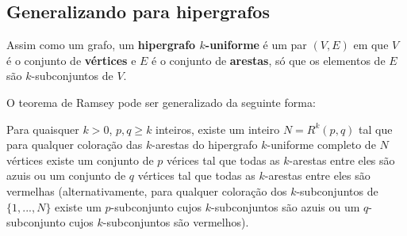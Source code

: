\subsection {Generalizando para hipergrafos}
Assim como um grafo, um \textbf{hipergrafo $k$-uniforme} é um par $(V,E)$ em que $V$ é o conjunto de \textbf{vértices} e $E$ é o conjunto de \textbf{arestas}, só que os elementos de $E$ são $k$-subconjuntos de $V$.

O teorema de Ramsey pode ser generalizado da seguinte forma:

\begin{teorema}
    Para quaisquer $k>0$, $p,q\geq k$ inteiros, existe um inteiro $N=R^k(p,q)$ tal que para qualquer coloração das $k$-arestas do hipergrafo $k$-uniforme completo de $N$ vértices existe um conjunto de $p$ vérices tal que todas as $k$-arestas entre eles são azuis ou um conjunto de $q$ vértices tal que todas as $k$-arestas entre eles são vermelhas (alternativamente, para qualquer coloração dos $k$-subconjuntos de $\{1,...,N\}$ existe um $p$-subconjunto cujos $k$-subconjuntos são azuis ou um $q$-subconjunto cujos $k$-subconjuntos são vermelhos).
\end{teorema}
